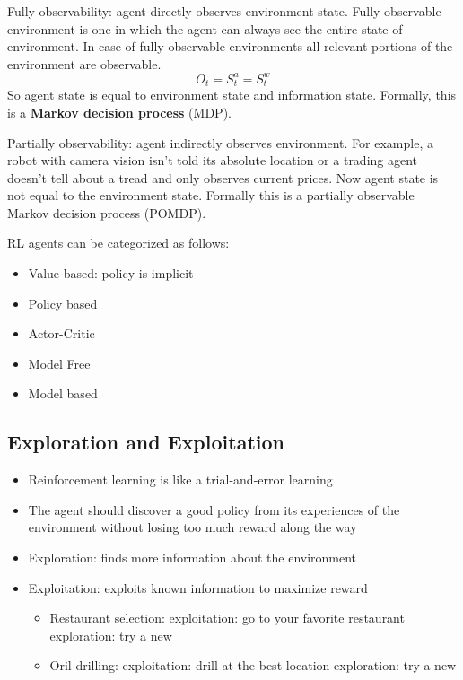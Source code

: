 Fully observability: agent directly observes environment state. Fully observable environment is one in which the agent can always see the entire state of environment. In case of fully observable environments all relevant portions of the environment are observable.
$$O_t=S_t^a=S_t^w$$
So agent state is equal to environment state and information state. Formally, this is a \textbf{Markov decision process} (MDP).

Partially observability: agent indirectly observes environment. For example, a robot with camera vision isn't told its absolute location or a trading agent doesn't tell about a tread and only observes current prices. Now agent state is not equal to the environment state. Formally this is a partially observable Markov decision process (POMDP). 

RL agents can be categorized as follows:
\begin{itemize}
	\item Value based: policy is implicit
	\item Policy based
	\item Actor-Critic
	\item Model Free
	\item Model based
\end{itemize}

\subsection{Exploration and Exploitation}
\begin{itemize}
	\item Reinforcement learning is like a trial-and-error learning
	\item The agent should discover a good policy from its experiences of the environment without losing too much reward along the way
	\item Exploration: finds more information about the environment
	\item Exploitation: exploits known information to maximize reward
	\begin{itemize}
		\item Restaurant selection: exploitation: go to your favorite restaurant exploration: try a new
		\item Oril drilling: exploitation: drill at the best location exploration: try a new
	\end{itemize}
\end{itemize}




